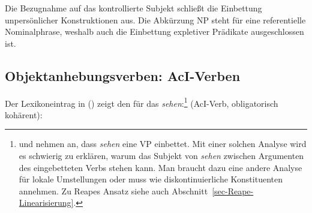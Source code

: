 {Die Bezugnahme auf das kontrollierte Subjekt schließt die Einbettung unpersönlicher Konstruktionen aus.
Die Abkürzung NP steht für eine referentielle Nominalphrase, weshalb auch die Einbettung
expletiver Prädikate ausgeschlossen ist.





\subsection{Objektanhebungsverben: AcI-Verben}
%



Der Lexikoneintrag in () zeigt den \localw für das \aciv \emph{sehen}:\footnote{
        \citet[]{HM94a} und \citet[]{Suchsland97a} nehmen an,
        dass \emph{sehen} eine VP einbettet. Mit einer solchen Analyse wird
        es schwierig zu erklären, warum das Subjekt von \emph{sehen} zwischen
        Argumenten des eingebetteten Verbs stehen kann. Man braucht
        dazu eine andere Analyse für lokale Umstellungen
        oder muss wie \citet{Reape94a} diskontinuierliche Konstituenten
        annehmen. Zu Reapes Ansatz siehe auch Abschnitt~\ref{sec-Reape-Linearisierung}.%
}
\eas
\label{le-sehen}%
 (AcI-Verb, obligatorisch kohärent):\\
}
